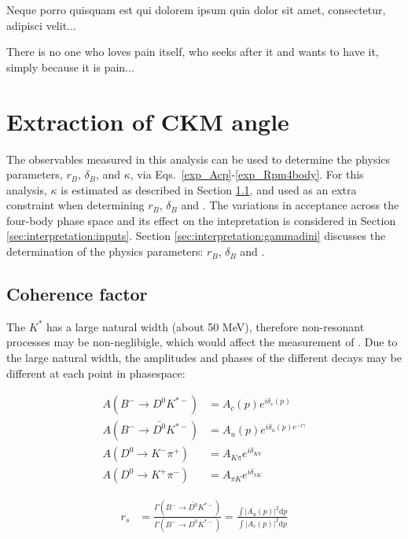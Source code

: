 \clearpage
\begin{savequote}[8cm]
\textlatin{Neque porro quisquam est qui dolorem ipsum quia dolor sit amet, consectetur, adipisci velit...}

There is no one who loves pain itself, who seeks after it and wants to have it, simply because it is pain...
\end{savequote}

\chapter{\label{ch:6-interpretation}Extraction of CKM angle \Pgamma} 

\minitoc

The \CP observables measured in this analysis can be used to determine the physics parameters, $r_B$, $\delta_B$, \Pgamma and $\kappa$, via Eqs.~\ref{exp_Acp}-\ref{exp_Rpm4body}. For this analysis, $\kappa$ is estimated as described in Section \ref{sec:interpretation:coherence}, and used as an extra constraint when determining $r_B$, $\delta_B$ and \Pgamma. The variations in acceptance across the four-body phase space and its effect on the intepretation is considered in Section \ref{sec:interpretation:inputs}. Section \ref{sec:interpretation:gammadini} discusses the determination of the physics parameters: $r_B$, $\delta_B$ and \Pgamma.

\section{Coherence factor}
\label{sec:interpretation:coherence}

The $K^*$ has a large natural width (about 50 MeV), therefore non-resonant processes may be non-neglibigle, which would affect the measurement of \Pgamma. Due to the large natural width, the amplitudes and phases of the different decays may be different at each point in phasespace:

\begin{align*}
A(B^- \to D^0 K^{*-}) &= A_c(p) e^{i\delta_c(p)} \\
A(B^- \to \bar{D^0} K^{*-}) &= A_u(p) e^{i\delta_u(p) e^{-i\gamma}} \\
A(D^0 \to K^-\pi^+) &= A_{K\pi} e^{i\delta_{K\pi}} \\
A(D^0 \to K^+\pi^-) &= A_{{\pi}K} e^{i\delta_{{\pi}K}} 
\end{align*}

\begin{align*}
r_s &= \frac{\Gamma(B^- \to \bar{D^0}K^{*-})}{\Gamma(B^- \to D^0K^{*-})} = \frac{\int \left|A_u(p)\right|^2 \mathrm{d}p}{\int \left|A_c(p)\right|^2 \mathrm{d}p}
\end{align*}

